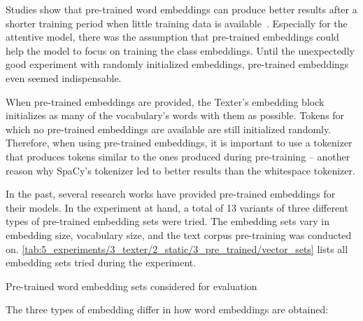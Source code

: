 Studies show that pre-trained word embeddings can produce better results after a shorter training period when little training data is available~\cite{Pan2010ASO}. Especially for the attentive model, there was the assumption that pre-trained embeddings could help the model to focus on training the class embeddings. Until the unexpectedly good experiment with randomly initialized embeddings, pre-trained embeddings even seemed indispensable.

When pre-trained embeddings are provided, the Texter's embedding block initializes as many of the vocabulary's words with them as possible. Tokens for which no pre-trained embeddings are available are still initialized randomly. Therefore, when using pre-trained embeddings, it is important to use a tokenizer that produces tokens similar to the ones produced during pre-training -- another reason why SpaCy's tokenizer led to better results than the whitespace tokenizer.

In the past, several research works have provided pre-trained embeddings for their models. In the experiment at hand, a total of 13 variants of three different types of pre-trained embedding sets were tried. The embedding sets vary in embedding size, vocabulary size, and the text corpus pre-training was conducted on. \autoref{tab:5_experiments/3_texter/2_static/3_pre_trained/vector_sets} lists all embedding sets tried during the experiment.

\begin{table}[t]
    \centering
    
    \caption{Pre-trained word embedding sets considered for evaluation}
    \label{tab:5_experiments/3_texter/2_static/3_pre_trained/vector_sets}
\end{table}

The three types of embedding differ in how word embeddings are obtained:

